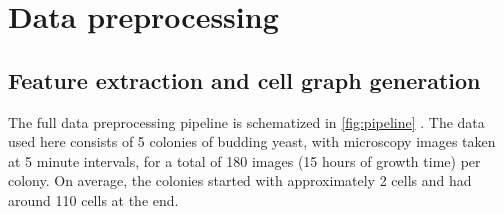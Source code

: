\documentclass[10pt,conference,compsocconf,a4paper]{IEEEtran}
\newcommand*{\shortautoref}[1]{%
	\begingroup
	\def\equationautorefname{\textsc{Eq.}}%
	\def\tableautorefname{\textsc{Tab.}}%
	\def\figureautorefname{\textsc{Fig.}}%
	\autoref{#1}%
	\endgroup
}
\begin{document}


\section{Data preprocessing} \label{sec:data_preprocessing}

	\subsection{Feature extraction and cell graph generation} \label{sec:data_preprocessing:featext}

		The full data preprocessing pipeline is schematized in \shortautoref{fig:pipeline}. The data used here consists of 5 colonies of budding yeast, with microscopy images taken at 5 minute intervals, for a total of 180 images (15 hours of growth time) per colony. On average, the colonies started with approximately 2 cells and had around 110 cells at the end.

\end{document}
